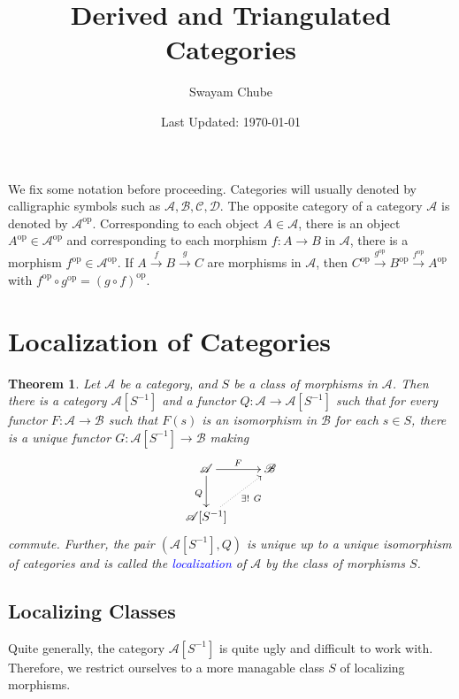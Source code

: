 \documentclass[11pt]{article}
\theoremstyle{thmstyle}
\newtheorem{theorem}{Theorem}[section]
\theoremstyle{defstyle}
\newcommand{\scrA}{\mathscr{A}}
\newcommand{\scrB}{\mathscr{B}}
\newcommand{\scrC}{\mathscr{C}}
\newcommand{\scrD}{\mathscr{D}}
\newcommand{\define}[1]{\textcolor{blue}{\textit{#1}}}
\newcommand{\op}{\mathrm{op}}
\begin{document}
\title{Derived and Triangulated Categories}
\author{Swayam Chube}
\date{Last Updated: \today}
\maketitle
\tableofcontents

\hrulefill 

We fix some notation before proceeding. Categories will usually denoted by calligraphic symbols such as $\scrA,\scrB,\scrC,\scrD$. The opposite category of a category $\scrA$ is denoted by $\scrA^{\op}$. Corresponding to each object $A\in\scrA$, there is an object $A^{\op}\in\scrA^{\op}$ and corresponding to each morphism $f\colon A\to B$ in $\scrA$, there is a morphism $f^{\op}\in\scrA^{\op}$. If $A\xrightarrow{f} B\xrightarrow{g} C$ are morphisms in $\scrA$, then $C^{\op}\xrightarrow{g^{\op}} B^{\op}\xrightarrow{f^{\op}} A^{\op}$ with $f^\op\circ g^\op = (g\circ f)^\op$.

\section{Localization of Categories}
\begin{theorem}
	Let $\scrA$ be a category, and $S$ be a class of morphisms in $\scrA$. Then there is a category $\scrA[S^{-1}]$ and a functor $Q\colon\scrA\to\scrA[S^{-1}]$ such that for every functor $F\colon\scrA\to\scrB$ such that $F(s)$ is an isomorphism in $\scrB$ for each $s\in S$, there is a unique functor $G\colon\scrA[S^{-1}]\to\scrB$ making 
	\begin{equation*}
		\xymatrix {
			\scrA\ar[r]^F\ar[d]_Q & \scrB\\
			\scrA[S^{-1}]\ar@{.>}[ru]_-{\exists!~G}
		}
	\end{equation*}
	commute. Further, the pair $(\scrA[S^{-1}], Q)$ is unique up to a unique isomorphism of categories and is called the \define{localization} of $\scrA$ by the class of morphisms $S$.
\end{theorem}

\subsection{Localizing Classes}

Quite generally, the category $\scrA[S^{-1}]$ is quite ugly and difficult to work with. Therefore, we restrict ourselves to a more managable class $S$ of localizing morphisms.
\end{document}
